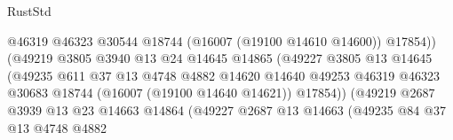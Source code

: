 \begin{lexlean}{RustStd}
\begin{coremodule}
                                              @46319
                                              @46323
                                              @30544
                                              @18744
                                              (@16007 (@19100 @14610 @14600))
                                              @17854))
                                          (@49219
                                            @3805
                                            @3940
                                            @13
                                            @24
                                            @14645
                                            @14865
                                            (@49227
                                              @3805
                                              @13
                                              @14645
                                              (@49235
                                                @611
                                                @37
                                                @13
                                                @4748
                                                @4882
                                                @14620
                                                @14640
                                                @49253
                                                @46319
                                                @46323
                                                @30683
                                                @18744
                                                (@16007 (@19100 @14640 @14621))
                                                @17854))
                                            (@49219
                                              @2687
                                              @3939
                                              @13
                                              @23
                                              @14663
                                              @14864
                                              (@49227
                                                @2687
                                                @13
                                                @14663
                                                (@49235
                                                  @84
                                                  @37
                                                  @13
                                                  @4748
                                                  @4882

\end{coremodule}
\end{lexlean}
